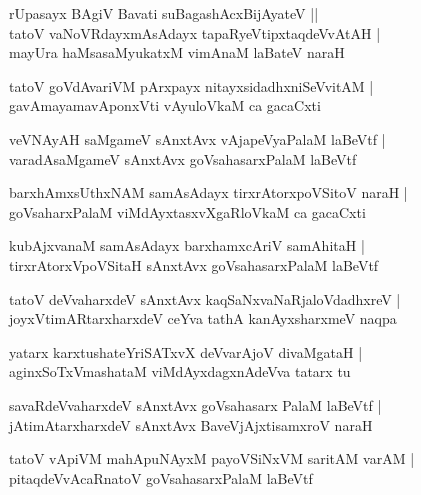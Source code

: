 \documentclass[twoside,12pt,openright]{book}
\newcounter{shloka}[chapter]
\begin{document}
\begin{shloka}
rUpasayx BAgiV Bavati suBagashAcxBijAyateV ||\\
tatoV vaNoVRdayxmAsAdayx tapaRyeVtipxtaqdeVvAtAH |\\
mayUra haMsasaMyukatxM vimAnaM laBateV naraH 
\end{shloka}

\begin{shloka}
tatoV goVdAvariVM pArxpayx nitayxsidadhxniSeVvitAM |\\
gavAmayamavAponxVti vAyuloVkaM ca gacaCxti 
\end{shloka}

\begin{shloka}
veVNAyAH saMgameV sAnxtAvx vAjapeVyaPalaM laBeVtf |\\
varadAsaMgameV sAnxtAvx goVsahasarxPalaM laBeVtf 
\end{shloka}

\begin{shloka}
barxhAmxsUthxNAM samAsAdayx tirxrAtorxpoVSitoV naraH |\\
goVsaharxPalaM viMdAyxtasxvXgaRloVkaM ca gacaCxti 
\end{shloka}

\begin{shloka}
kubAjxvanaM samAsAdayx barxhamxcAriV samAhitaH |\\
tirxrAtorxVpoVSitaH sAnxtAvx goVsahasarxPalaM laBeVtf
\end{shloka}

\begin{shloka}
tatoV deVvaharxdeV sAnxtAvx kaqSaNxvaNaRjaloVdadhxreV |\\
joyxVtimARtarxharxdeV ceYva tathA kanAyxsharxmeV naqpa 
\end{shloka}

\begin{shloka}
yatarx karxtushateYriSATxvX deVvarAjoV divaMgataH |\\
aginxSoTxVmashataM viMdAyxdagxnAdeVva tatarx tu 
\end{shloka}

\begin{shloka}
savaRdeVvaharxdeV sAnxtAvx goVsahasarx PalaM laBeVtf |\\
jAtimAtarxharxdeV sAnxtAvx BaveVjAjxtisamxroV naraH 
\end{shloka}

\begin{shloka}
tatoV vApiVM mahApuNAyxM payoVSiNxVM saritAM varAM |\\
pitaqdeVvAcaRnatoV goVsahasarxPalaM laBeVtf 
\end{shloka}
\end{document}
